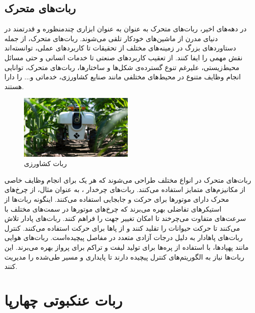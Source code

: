 \subsection{ربات‌های متحرک}
در دهه‌های اخیر، ربات‌های متحرک
\noindent\unskip{}
به عنوان به عنوان ابزاری چندمنظوره و قدرتمند در دنیای مدرن از ماشین‌های خودکار تلقی می‌شوند. ربات‌های متحرک، از جمله دستاوردهای بزرگ در زمینه‌های مختلف از تحقیقات تا کاربردهای عملی، توانسته‌اند نقش مهمی را ایفا کنند. از تعقیب کاربردهای صنعتی تا خدمات انسانی و حتی مسائل محیط‌زیستی، علیرغم تنوع گسترده‌ی شکل‌ها و ساختارها، ربات‌های متحرک، توانایی انجام وظایف متنوع در محیط‌های مختلفی مانند صنایع کشاورزی، خدماتی و... را دارا هستند.
\begin{figure}[H]
	\centering
	\includegraphics[width=0.5\textwidth]{./images/Chapter1/AgRobot}	
	\caption[ربات کشاورزی]{ربات کشاورزی \cite{AgRobot}}
	\label{ربات کشاورزی}
\end{figure}
\noindent
\unskip

ربات‌های متحرک در انواع مختلف طراحی می‌شوند که هر یک برای انجام وظایف خاصی از مکانیزم‌های متمایز استفاده می‌کنند. ربات‌های چرخدار
\noindent\unskip{}
، به عنوان مثال، از چرخ‌های محرک دارای موتورها برای حرکت و جابجایی استفاده می‌کنند. اینگونه ربات‌ها از استیکرهای تفاضلی بهره می‌برند که چرخ‌های موتورها در سمت‌های مختلف با سرعت‌های متفاوت می‌چرخند تا امکان تغییر جهت را فراهم کنند. 
ربات‌های پادار
\noindent\unskip{}
تلاش می‌کنند تا حرکت حیوانات را تقلید کنند و از پاها برای حرکت استفاده می‌کنند. کنترل ربات‌های پاهادار به دلیل درجات آزادی متعدد در مفاصل پیچیده‌است. ربات‌های هوایی مانند پهپادها، با استفاده از پره‌ها برای تولید لیفت و تراکم برای پرواز بهره می‌برند. این ربات‌ها نیاز به الگوریتم‌های کنترل پیچیده دارند تا پایداری و مسیر طی‌شده را مدیریت کنند.
\cite{Craig}

\section{ربات عنکبوتی چهارپا}
